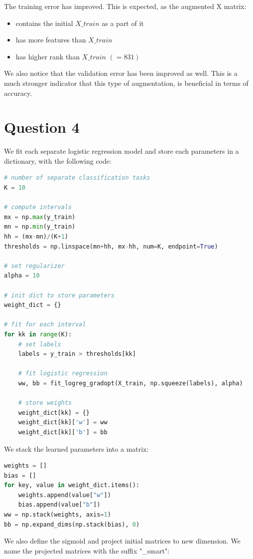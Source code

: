 \documentclass{article}
\begin{document}
The training error has improved. This is expected, as the augmented X matrix:
\begin{itemize}
    \item contains the initial $X\_train$ as a part of it
    \item has more features than $X\_train$
    \item has higher rank than $X\_train$ $(=831)$
    
\end{itemize}
We also notice that the validation error has been improved as well. This is a much stronger indicator that this type of augmentation, is beneficial in terms of accuracy.


\section*{Question 4}

We fit each separate logistic regression model and store each parameters in a dictionary, with the following code:

\begin{lstlisting}[language=Python]
# number of separate classification tasks
K = 10 

# compute intervals
mx = np.max(y_train)
mn = np.min(y_train)
hh = (mx-mn)/(K+1)
thresholds = np.linspace(mn+hh, mx-hh, num=K, endpoint=True)

# set regularizer
alpha = 10 

# init dict to store parameters
weight_dict = {}

# fit for each interval
for kk in range(K):
    # set labels
    labels = y_train > thresholds[kk]

    # fit logistic regression
    ww, bb = fit_logreg_gradopt(X_train, np.squeeze(labels), alpha)
    
    # store weights
    weight_dict[kk] = {}
    weight_dict[kk]['w'] = ww
    weight_dict[kk]['b'] = bb
\end{lstlisting}

We stack the learned parameters into a matrix:

\begin{lstlisting}[language=Python]
weights = []
bias = []
for key, value in weight_dict.items():
    weights.append(value["w"])
    bias.append(value["b"])
ww = np.stack(weights, axis=1)
bb = np.expand_dims(np.stack(bias), 0)
\end{lstlisting}

We also define the sigmoid and project initial matrices to new dimension. We name the projected matrices with the suffix "\_smart":
\end{document}
